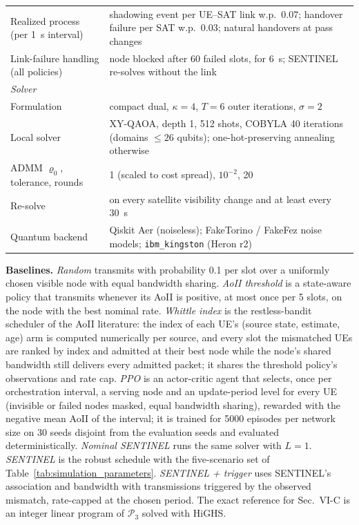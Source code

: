 \begin{table}[t]
\begin{tabular}{p{} p{}}
Realized process (per 1~s interval) & shadowing event per UE--SAT link w.p.\ 0.07; handover failure per SAT w.p.\ 0.03; natural handovers at pass changes \\
Link-failure handling (all policies) & node blocked after 60 failed slots, for 6~s; SENTINEL re-solves without the link \\
\hline
\multicolumn{2}{l}{\emph{Solver}} \\
Formulation & compact dual, $\kappa=4$, $T=6$ outer iterations, $\sigma=2$ \\
Local solver & XY-QAOA, depth 1, 512 shots, COBYLA 40 iterations (domains $\le 26$ qubits); one-hot-preserving annealing otherwise \\
ADMM $\varrho_0$, tolerance, rounds & 1 (scaled to cost spread), $10^{-2}$, 20 \\
Re-solve & on every satellite visibility change and at least every 30~s \\
Quantum backend & Qiskit Aer (noiseless); FakeTorino / FakeFez noise models; \texttt{ibm\_kingston} (Heron r2) \\
\hline
\end{tabular}
\end{table}

\textbf{Baselines.} \emph{Random} transmits with probability 0.1 per slot over a uniformly chosen visible node with
equal bandwidth sharing. \emph{AoII threshold} is a state-aware policy that transmits whenever its AoII is positive, at
most once per 5 slots, on the node with the best nominal rate. \emph{Whittle index} is the restless-bandit
scheduler of the AoII literature: the index of each UE's (source state, estimate, age) arm is computed numerically per
source, and every slot the mismatched UEs are ranked by index and admitted at their best node while the node's shared
bandwidth still delivers every admitted packet; it shares the threshold policy's observations and rate cap.
\emph{PPO} is an actor-critic agent that selects, once per orchestration interval, a serving node and an update-period
level for every UE (invisible or failed nodes masked, equal bandwidth sharing), rewarded with the negative mean AoII of
the interval; it is trained for 5000 episodes per network size on 30 seeds disjoint from the evaluation seeds and
evaluated deterministically. \emph{Nominal SENTINEL} runs the same solver with
$L=1$. \emph{SENTINEL} is the robust schedule with the five-scenario set of Table~\ref{tab:simulation_parameters}. \emph{SENTINEL + trigger} uses SENTINEL's association and
bandwidth with transmissions triggered by the observed mismatch, rate-capped at the chosen period. The exact
reference for Sec.~VI-C is an integer linear program of $\mathscr{P}_3$ solved with HiGHS.

